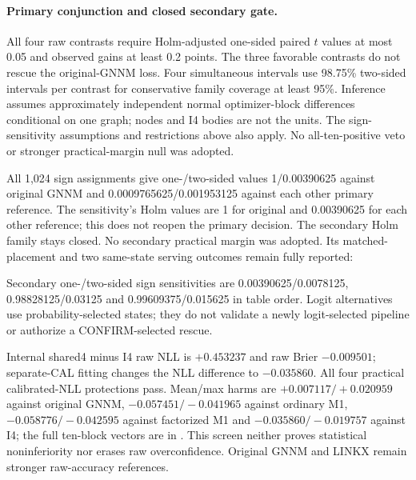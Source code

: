 

\paragraph{Primary conjunction and closed secondary gate.}
All four raw contrasts require Holm-adjusted one-sided paired $t$ values at most 0.05 and observed gains at least 0.2 points. The three favorable contrasts do not rescue the original-GNNM loss. Four simultaneous intervals use 98.75\% two-sided intervals per contrast for conservative family coverage at least 95\%. Inference assumes approximately independent normal optimizer-block differences conditional on one graph; nodes and I4 bodies are not the units. The sign-sensitivity assumptions and restrictions above also apply. No all-ten-positive veto or stronger practical-margin null was adopted.



All 1,024 sign assignments give one-/two-sided values 1/0.00390625 against original GNNM and 0.0009765625/0.001953125 against each other primary reference. The sensitivity's Holm values are 1 for original and 0.00390625 for each other reference; this does not reopen the primary decision. The secondary Holm family stays closed. No secondary practical margin was adopted. Its matched-placement and two same-state serving outcomes remain fully reported:



Secondary one-/two-sided sign sensitivities are 0.00390625/0.0078125, 0.98828125/0.03125 and 0.99609375/0.015625 in table order. Logit alternatives use probability-selected states; they do not validate a newly logit-selected pipeline or authorize a CONFIRM-selected rescue.

Internal shared4 minus I4 raw NLL is $+0.453237$ and raw Brier $-0.009501$; separate-CAL fitting changes the NLL difference to $-0.035860$. All four practical calibrated-NLL protections pass. Mean/max harms are $+0.007117/+0.020959$ against original GNNM, $-0.057451/-0.041965$ against ordinary M1, $-0.058776/-0.042595$ against factorized M1 and $-0.035860/-0.019757$ against I4; the full ten-block vectors are in . This screen neither proves statistical noninferiority nor erases raw overconfidence. Original GNNM and LINKX remain stronger raw-accuracy references.

